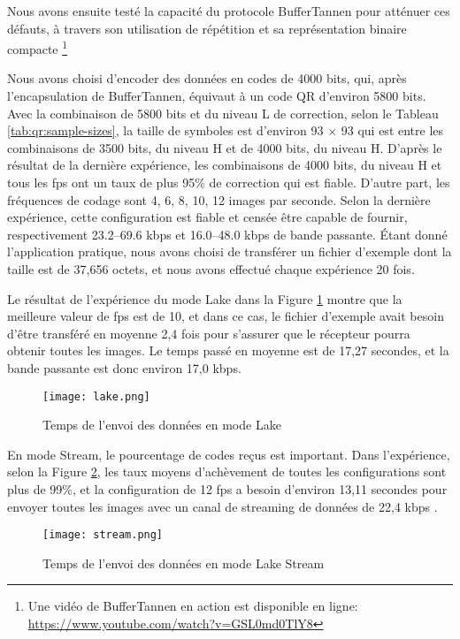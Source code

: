 Nous avons ensuite testé la capacité du protocole BufferTannen pour atténuer ces défauts, à travers son utilisation de répétition et sa représentation binaire compacte \footnote{Une vidéo de BufferTannen en action est disponible en ligne: \url{https://www.youtube.com/watch?v=GSL0md0TlY8}}

Nous avons choisi d'encoder des données en codes de 4000 bits, qui, après l'encapsulation de BufferTannen, équivaut à un code QR d'environ 5800 bits. Avec la combinaison de 5800 bits et du niveau L de correction, selon le Tableau \ref{tab:qr:sample-sizes}, la taille de symboles est d'environ 93 $\times$ 93 qui est entre les combinaisons de 3500 bits, du niveau H et de 4000 bits, du niveau H. D'après le résultat de la dernière expérience, les combinaisons de 4000 bits, du niveau H et tous les fps ont un taux de plus 95\% de correction   qui est fiable. D'autre part, les fréquences de codage sont 4, 6, 8, 10, 12 images par seconde. Selon la dernière expérience, cette configuration est fiable et censée être capable de fournir, respectivement 23.2--69.6 kbps et 16.0--48.0 kbps de bande passante. Étant donné l'application pratique, nous avons choisi de transférer un fichier d'exemple dont la taille est de 37,656 octets, et nous avons effectué chaque expérience 20 fois.

Le résultat de l'expérience du mode Lake dans la Figure \ref{img-explake} montre que la meilleure valeur de fps est de 10, et dans ce cas, le fichier d'exemple avait besoin d'être transféré en moyenne 2,4 fois pour s'assurer que le récepteur pourra obtenir toutes les images. Le temps passé en moyenne est de 17,27 secondes, et la bande passante est donc environ 17,0 kbps.

\begin{figure}[ht]
\begin{center}
\centering
\texttt{[image: lake.png]}
\caption{Temps de l'envoi des données en mode Lake}
\label{img-explake}
\end{center}
\end{figure}

En mode Stream, le pourcentage de codes reçus est important. Dans l'expérience, selon la Figure \ref{img-expstream}, les taux moyens d'achèvement de toutes les configurations sont plus de 99\%, et la configuration de 12 fps a besoin d'environ 13,11 secondes pour envoyer toutes les images avec un canal de streaming de données de 22,4 kbps .

\begin{figure}[ht]
\begin{center}
\centering
\texttt{[image: stream.png]}
\caption{Temps de l'envoi des données en mode Lake Stream}
\label{img-expstream}
\end{center}
\end{figure}

